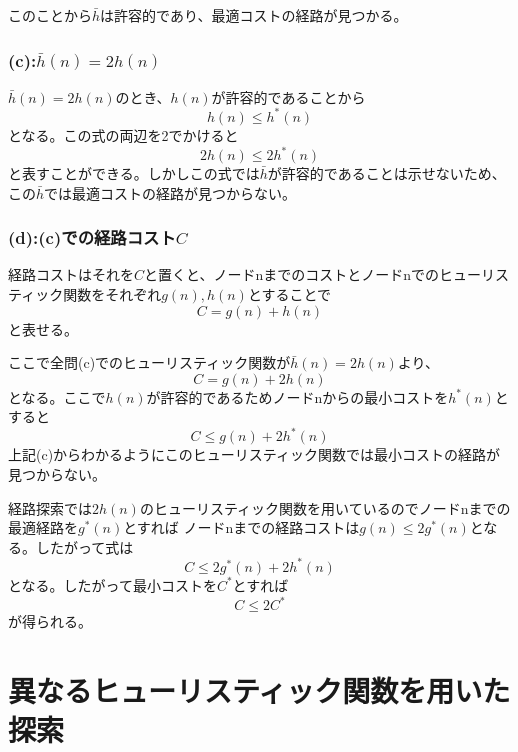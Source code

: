 \documentclass[a4paper,11pt,dvipdfmx]{jsarticle}
\begin{document}
このことから$\bar{h}$は許容的であり、最適コストの経路が見つかる。

\subsubsection{(c):$\bar{h}(n)=2h(n)$}
$\bar{h}(n)=2h(n)$のとき、$h(n)$が許容的であることから
\begin{equation*}
    h(n) \leq h^*(n)
\end{equation*}
となる。この式の両辺を2でかけると
\begin{equation*}
    2 h(n) \leq 2 h^*(n) 
\end{equation*}
と表すことができる。しかしこの式では$\bar{h}$が許容的であることは示せないため、この$\bar{h}$では最適コストの経路が見つからない。

\subsubsection{(d):(c)での経路コスト$C$}
経路コストはそれを$C$と置くと、ノードnまでのコストとノードnでのヒューリスティック関数をそれぞれ$g(n),h(n)$とすることで
\begin{equation*}
    C = g(n) + h(n) 
\end{equation*}
と表せる。

ここで全問(c)でのヒューリスティック関数が$\bar{h}(n)=2h(n)$より、
\begin{equation*}
    C = g(n) + 2h(n) 
\end{equation*}
となる。ここで$h(n)$が許容的であるためノードnからの最小コストを$h^*(n)$とすると
\begin{equation*}
    C \leq g(n) + 2h^*(n) 
\end{equation*}
上記(c)からわかるようにこのヒューリスティック関数では最小コストの経路が見つからない。

経路探索では$2h(n)$のヒューリスティック関数を用いているのでノードnまでの最適経路を$g^*(n)$とすれば
ノードnまでの経路コストは$g(n) \leq 2g^*(n)$となる。したがって式は
\begin{equation*}
    C \leq 2g^*(n) + 2h^*(n) 
\end{equation*}
となる。したがって最小コストを$C^*$とすれば
\begin{equation*}
    C \leq 2C^*
\end{equation*}
が得られる。

\section{異なるヒューリスティック関数を用いた探索}
\end{document}
